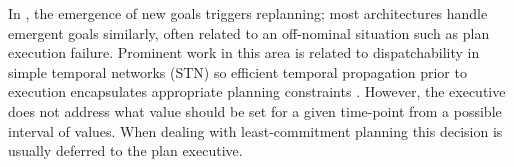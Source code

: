 In \cite{lemai-chenevier2004}, the emergence of new goals triggers
replanning; most architectures handle emergent goals similarly, often
related to an off-nominal situation such as plan execution
failure. Prominent work in this area is related to dispatchability in
simple temporal networks (STN) so efficient temporal propagation prior
to execution encapsulates appropriate planning constraints
\cite{mus98a}.  %
However, the executive does not address what value should be set for a
given time-point from a possible interval of values.  When dealing
with least-commitment planning this decision is usually deferred to
the plan executive. %




